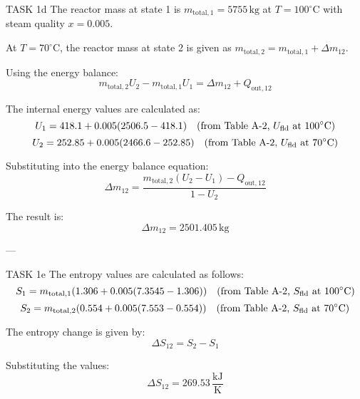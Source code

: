 TASK 1d  
The reactor mass at state 1 is \( m_{\text{total},1} = 5755 \, \text{kg} \) at \( T = 100^\circ\text{C} \) with steam quality \( x = 0.005 \).  

At \( T = 70^\circ\text{C} \), the reactor mass at state 2 is given as \( m_{\text{total},2} = m_{\text{total},1} + \Delta m_{12} \).  

Using the energy balance:  
\[
m_{\text{total},2} U_2 - m_{\text{total},1} U_1 = \Delta m_{12} + Q_{\text{out},12}
\]  

The internal energy values are calculated as:  
\[
U_1 = 418.1 + 0.005 (2506.5 - 418.1) \quad \text{(from Table A-2, \( U_{\text{fld}} \) at \( 100^\circ\text{C} \))}
\]  
\[
U_2 = 252.85 + 0.005 (2466.6 - 252.85) \quad \text{(from Table A-2, \( U_{\text{fld}} \) at \( 70^\circ\text{C} \))}
\]  

Substituting into the energy balance equation:  
\[
\Delta m_{12} = \frac{m_{\text{total},2}(U_2 - U_1) - Q_{\text{out},12}}{1 - U_2}
\]  

The result is:  
\[
\Delta m_{12} = 2501.405 \, \text{kg}
\]  

---

TASK 1e  
The entropy values are calculated as follows:  
\[
S_1 = m_{\text{total},1} (1.306 + 0.005 (7.3545 - 1.306)) \quad \text{(from Table A-2, \( S_{\text{fld}} \) at \( 100^\circ\text{C} \))}
\]  
\[
S_2 = m_{\text{total},2} (0.554 + 0.005 (7.553 - 0.554)) \quad \text{(from Table A-2, \( S_{\text{fld}} \) at \( 70^\circ\text{C} \))}
\]  

The entropy change is given by:  
\[
\Delta S_{12} = S_2 - S_1
\]  

Substituting the values:  
\[
\Delta S_{12} = 269.53 \, \frac{\text{kJ}}{\text{K}}
\]  

